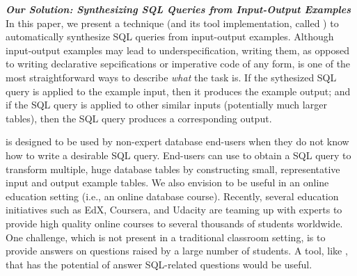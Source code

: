 

\vspace{1mm}
\noindent \textbf{\textit{Our Solution: Synthesizing SQL Queries from Input-Output Examples}}
In this paper, we present a technique (and its tool
implementation, called \ourtool) to automatically synthesize SQL queries
from input-output examples. Although input-output examples may lead to
underspecification, writing them, as opposed to writing
declarative sepcifications or imperative code
of any form, is one of the most straightforward ways
to describe \textit{what} the task is.
If the sythesized SQL query is applied
to the example input, then it produces the example output; and if the
SQL query is applied to other similar inputs (potentially much larger tables),
then the SQL query produces a corresponding output.




\ourtool is designed to be used by non-expert database
end-users when they do not know how
to write a desirable SQL query. 
End-users can use \ourtool to obtain a SQL query to transform
multiple, huge database tables by constructing small, representative
input and output example tables. 
We also envision \ourtool to be useful in an online education
setting (i.e., an online database course). Recently, several
education initiatives such as EdX, Coursera,
and Udacity are teaming up with experts to provide
high quality online courses
to several thousands of students worldwide.
One challenge, which is not present in a traditional classroom
setting, is to provide answers on questions raised by a large
number of students. A tool, like \ourtool,
that has the potential of answer SQL-related questions
would be useful.


